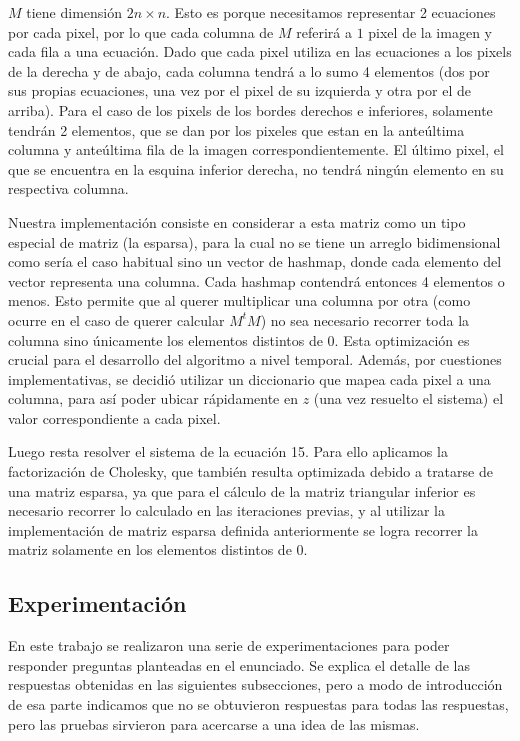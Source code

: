 $M$ tiene dimensión $2n \times n$. Esto es porque necesitamos representar 2 ecuaciones por cada pixel, por lo que cada columna de $M$ referirá a $1$ pixel de la imagen y cada fila a una ecuación. Dado que cada pixel utiliza en las ecuaciones a los pixels de la derecha y de abajo, cada columna tendrá a lo sumo 4 elementos (dos por sus propias ecuaciones, una vez por el pixel de su izquierda y otra por el de arriba). Para el caso de los pixels de los bordes derechos e inferiores, solamente tendrán 2 elementos, que se dan por los pixeles que estan en la anteúltima columna y anteúltima fila de la imagen correspondientemente. El último pixel, el que se encuentra en la esquina inferior derecha, no tendrá ningún elemento en su respectiva columna.


Nuestra implementación consiste en considerar a esta matriz como un tipo especial de matriz (la esparsa), para la cual no se tiene un arreglo bidimensional como sería el caso habitual sino un vector de hashmap, donde cada elemento del vector representa una columna. Cada hashmap contendrá entonces 4 elementos o menos. Esto permite que al querer multiplicar una columna por otra (como ocurre en el caso de querer calcular $M^tM$) no sea necesario recorrer toda la columna sino únicamente los elementos distintos de 0. Esta optimización es crucial para el desarrollo del algoritmo a nivel temporal. Además, por cuestiones implementativas, se decidió utilizar un diccionario que mapea cada pixel a una columna, para así poder ubicar rápidamente en $z$ (una vez resuelto el sistema) el valor correspondiente a cada pixel.

Luego resta resolver el sistema de la ecuación 15. Para ello aplicamos la factorización de Cholesky, que también resulta optimizada debido a tratarse de una matriz esparsa, ya que para el cálculo de la matriz triangular inferior es necesario recorrer lo calculado en las iteraciones previas, y al utilizar la implementación de matriz esparsa definida anteriormente se logra recorrer la matriz solamente en los elementos distintos de 0.


\subsection{Experimentación}

En este trabajo se realizaron una serie de experimentaciones para poder responder preguntas planteadas en el enunciado. Se explica el detalle de las respuestas obtenidas en las siguientes subsecciones, pero a modo de introducción de esa parte indicamos que no se obtuvieron respuestas para todas las respuestas, pero las pruebas sirvieron para acercarse a una idea de las mismas.

